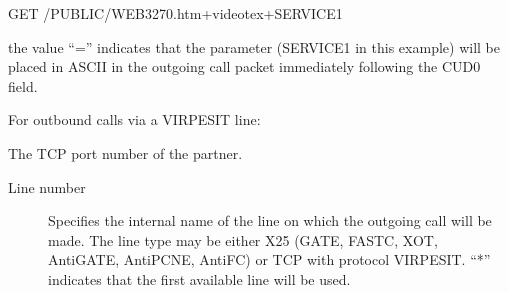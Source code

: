 \documentclass[letterpaper,10pt,english]{sphinxmanual}
\begin{document}
\begin{sphinxVerbatim}[commandchars=\\\{\}]
GET /PUBLIC/WEB3270.htm+videotex+SERVICE1

the value “=” indicates that the parameter (SERVICE1 in this example) will be placed in ASCII in the outgoing call packet immediately following the CUD0 field.

For outbound calls via a VIRPESIT line:

    The TCP port number of the partner.
\end{sphinxVerbatim}
\begin{description}
\item[{Line number}] \leavevmode
Specifies the internal name of the line on which the outgoing call will be made. The line type may be either X25 (GATE, FASTC, XOT, AntiGATE, AntiPCNE, AntiFC) or TCP with protocol VIRPESIT. “*” indicates that the first available line will be used.

\end{description}
\end{document}
